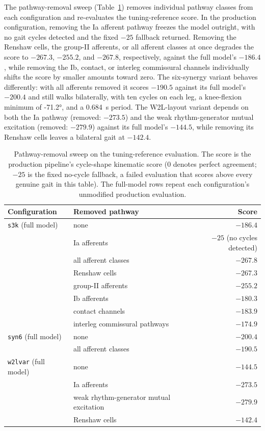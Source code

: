 The pathway-removal sweep (Table~\ref{tab:walker_ablations}) removes individual pathway classes from each configuration and re-evaluates the tuning-reference score. In the production configuration, removing the Ia afferent pathway freezes the model outright, with no gait cycles detected and the fixed $-25$ fallback returned. Removing the Renshaw cells, the group-II afferents, or all afferent classes at once degrades the score to $-267.3$, $-255.2$, and $-267.8$, respectively, against the full model's $-186.4$, while removing the Ib, contact, or interleg commissural channels individually shifts the score by smaller amounts toward zero. The six-synergy variant behaves differently: with all afferents removed it scores $-190.5$ against its full model's $-200.4$ and still walks bilaterally, with ten cycles on each leg, a knee-flexion minimum of \ang{-71.2}, and a \qty{0.684}{\second} period. The W2L-layout variant depends on both the Ia pathway (removed: $-273.5$) and the weak rhythm-generator mutual excitation (removed: $-279.9$) against its full model's $-144.5$, while removing its Renshaw cells leaves a bilateral gait at $-142.4$.

\begin{table}[htbp]
\caption{Pathway-removal sweep on the tuning-reference evaluation. The score is the production pipeline's cycle-shape kinematic score (0 denotes perfect agreement; $-25$ is the fixed no-cycle fallback, a failed evaluation that scores above every genuine gait in this table). The full-model rows repeat each configuration's unmodified production evaluation.}
\label{tab:walker_ablations}
\begin{tabular}{@{}llr@{}}
\toprule
\textbf{Configuration} & \textbf{Removed pathway} & \textbf{Score} \\
\midrule
\texttt{s3k} (full model) & none & $-186.4$ \\
 & Ia afferents & $-25$ (no cycles detected) \\
 & all afferent classes & $-267.8$ \\
 & Renshaw cells & $-267.3$ \\
 & group-II afferents & $-255.2$ \\
 & Ib afferents & $-180.3$ \\
 & contact channels & $-183.9$ \\
 & interleg commissural pathways & $-174.9$ \\
\addlinespace
\texttt{syn6} (full model) & none & $-200.4$ \\
 & all afferent classes & $-190.5$ \\
\addlinespace
\texttt{w2lvar} (full model) & none & $-144.5$ \\
 & Ia afferents & $-273.5$ \\
 & weak rhythm-generator mutual excitation & $-279.9$ \\
 & Renshaw cells & $-142.4$ \\
\bottomrule
\end{tabular}
\end{table}

